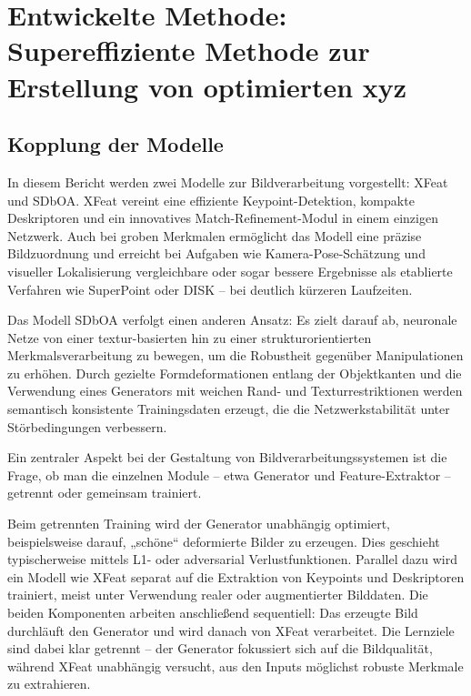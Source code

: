 \chapter{Entwickelte Methode: Supereffiziente Methode zur Erstellung von optimierten xyz}
\label{ch:EntwickelteMethode}






\section{Kopplung der Modelle}
In diesem Bericht werden zwei Modelle zur Bildverarbeitung vorgestellt: XFeat und SDbOA.
XFeat vereint eine effiziente Keypoint-Detektion, kompakte Deskriptoren und ein innovatives Match-Refinement-Modul in einem einzigen Netzwerk. Auch bei groben Merkmalen ermöglicht das Modell eine präzise Bildzuordnung und erreicht bei Aufgaben wie Kamera-Pose-Schätzung und visueller Lokalisierung vergleichbare oder sogar bessere Ergebnisse als etablierte Verfahren wie SuperPoint oder DISK – bei deutlich kürzeren Laufzeiten. 

Das Modell SDbOA verfolgt einen anderen Ansatz: Es zielt darauf ab, neuronale Netze von einer textur-basierten hin zu einer strukturorientierten Merkmalsverarbeitung zu bewegen, um die Robustheit gegenüber Manipulationen zu erhöhen. Durch gezielte Formdeformationen entlang der Objektkanten und die Verwendung eines Generators mit weichen Rand- und Texturrestriktionen werden semantisch konsistente Trainingsdaten erzeugt, die die Netzwerkstabilität unter Störbedingungen verbessern.

Ein zentraler Aspekt bei der Gestaltung von Bildverarbeitungssystemen ist die Frage, ob man die einzelnen Module – etwa Generator und Feature-Extraktor – getrennt oder gemeinsam trainiert. 

Beim getrennten Training wird der Generator unabhängig optimiert, beispielsweise darauf, „schöne“ deformierte Bilder zu erzeugen. Dies geschieht typischerweise mittels L1- oder adversarial Verlustfunktionen. Parallel dazu wird ein Modell wie XFeat separat auf die Extraktion von Keypoints und Deskriptoren trainiert, meist unter Verwendung realer oder augmentierter Bilddaten. Die beiden Komponenten arbeiten anschließend sequentiell: Das erzeugte Bild durchläuft den Generator und wird danach von XFeat verarbeitet. Die Lernziele sind dabei klar getrennt – der Generator fokussiert sich auf die Bildqualität, während XFeat unabhängig versucht, aus den Inputs möglichst robuste Merkmale zu extrahieren. 

